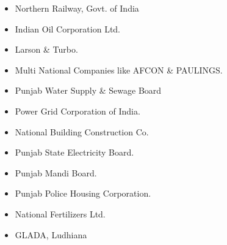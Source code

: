 \begin{itemize}
\item Northern Railway, Govt. of India
\item Indian Oil Corporation Ltd.
\item Larson \& Turbo.
\item Multi National Companies like AFCON \& PAULINGS.
\item Punjab Water Supply \& Sewage Board
\item Power Grid Corporation of India.
\item National Building Construction Co.
\item Punjab State Electricity Board.
\item Punjab Mandi Board.
\item Punjab Police Housing Corporation.
\item National Fertilizers Ltd.
\item GLADA, Ludhiana
\end{itemize}

